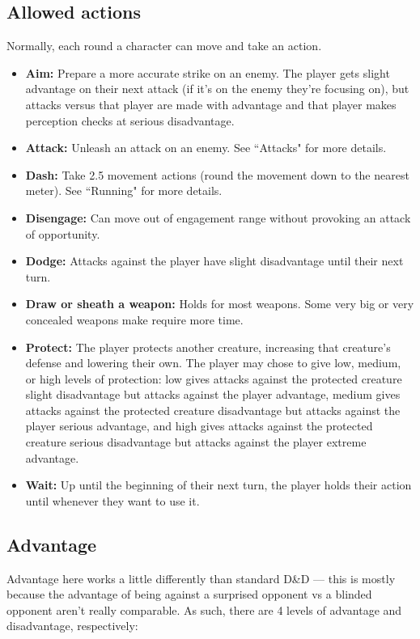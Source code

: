 \documentclass[letterpaper,12pt]{article}
\begin{document}
\subsection{Allowed actions}

Normally, each round a character can move and take an action.

\begin{itemize}
\item \textbf{Aim:} Prepare a more accurate strike on an enemy. The player gets slight advantage on their next attack (if it's on the enemy they're focusing on), but attacks versus that player are made with advantage and that player makes perception checks at serious disadvantage.
\item \textbf{Attack:} Unleash an attack on an enemy. See ``Attacks" for more details.
\item \textbf{Dash:} Take 2.5 movement actions (round the movement down to the nearest meter). See ``Running" for more details.
\item \textbf{Disengage:} Can move out of engagement range without provoking an attack of opportunity.
\item \textbf{Dodge:} Attacks against the player have slight disadvantage until their next turn.
\item \textbf{Draw or sheath a weapon:} Holds for most weapons. Some very big or very concealed weapons make require more time. 
\item \textbf{Protect:} The player protects another creature, increasing that creature's defense and lowering their own. The player may chose to give low, medium, or high levels of protection: low gives attacks against the protected creature slight disadvantage but attacks against the player advantage, medium gives attacks against the protected creature disadvantage but attacks against the player serious advantage, and high gives attacks against the protected creature serious disadvantage but attacks against the player extreme advantage. 
\item \textbf{Wait:} Up until the beginning of their next turn, the player holds their action until whenever they want to use it.
\end{itemize}


\subsection{Advantage}

Advantage here works a little differently than standard D\&D --- this is mostly because the advantage of being against a surprised opponent vs a blinded opponent aren't really comparable. As such, there are 4 levels of advantage and disadvantage, respectively: 
\end{document}
